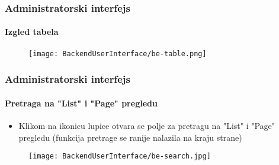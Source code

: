 
\begin{frame}[fragile]
	\frametitle{Administratorski interfejs}
	\framesubtitle{Izgled tabela}

	\begin{figure}
		\texttt{[image: BackendUserInterface/be-table.png]}
	\end{figure}

\end{frame}


\begin{frame}[fragile]
	\frametitle{Administratorski interfejs}
	\framesubtitle{Pretraga na "List" i "Page" pregledu}

	\begin{itemize}
		\item Klikom na ikonicu lupice otvara se polje za pretragu na "List" i "Page" pregledu \newline
			(funkcija pretrage se ranije nalazila na kraju strane)
	\end{itemize}

	\begin{figure}
		\texttt{[image: BackendUserInterface/be-search.jpg]}
	\end{figure}

\end{frame}


